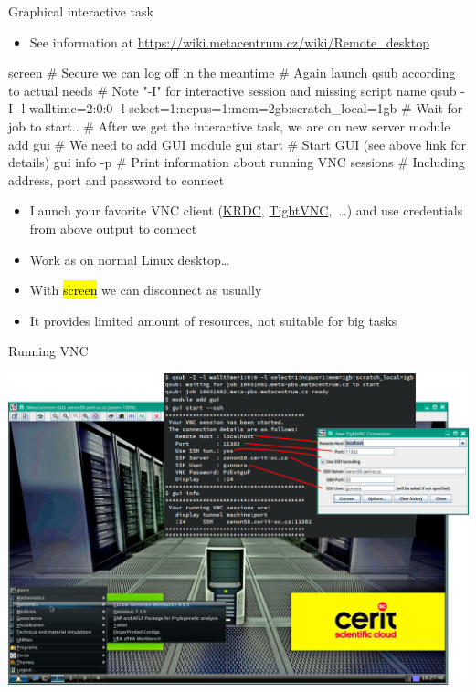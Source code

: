 \documentclass[compress, ucs, xelatex, 11pt, xcolor=svgnames, aspectratio=169,
	hyperref={
		bookmarks=true,
		unicode=true,
		colorlinks=true,
		pdftitle={Linux, command line and MetaCentrum},
		plainpages=false,
		pdfauthor={Vojtech Zeisek},
		pdfsubject={Course about use of Linux command line, writing shell scripts and using MetaCentrum of CESNET},
		pdfcreator={XeLaTeX},
		pdfkeywords={Linux, GNU, BASH, shell, command line, MetaCentrum},
		linkcolor=DarkRed, %
		anchorcolor=DarkBlue, %
		citecolor=Indigo, %
		filecolor=NavyBlue, %
		menucolor=DarkMagenta, %
		urlcolor=DarkBlue, %
		pdftex},
	url={hyphens, lowtilde} %
	]{beamer}
\renewcommand{\texttt}[1]{\hl{\ttfamily #1}}
\begin{document}
\begin{frame}[fragile]{Graphical interactive task}
	\begin{itemize}
		\item See information at \url{https://wiki.metacentrum.cz/wiki/Remote_desktop}
	\end{itemize}
	\begin{bashcode}
    screen # Secure we can log off in the meantime
    # Again launch qsub according to actual needs
    # Note "-I" for interactive session and missing script name
    qsub -I -l walltime=2:0:0 -l select=1:ncpus=1:mem=2gb:scratch_local=1gb
    # Wait for job to start..
    # After we get the interactive task, we are on new server
    module add gui # We need to add GUI module
    gui start # Start GUI (see above link for details)
    gui info -p # Print information about running VNC sessions
                # Including address, port and password to connect
	\end{bashcode}
	\begin{itemize}
		\item Launch your favorite VNC client (\href{https://kde.org/applications/internet/krdc/}{KRDC}, \href{https://www.tightvnc.com/}{TightVNC},~\ldots) and use credentials from above output to connect
		\item Work as on normal Linux desktop\ldots
		\item With \texttt{screen} we can disconnect as usually
		\item It provides limited amount of resources, not suitable for big tasks
	\end{itemize}
\end{frame}

\begin{frame}{Running VNC}
	\begin{center}
		\includegraphics[width=\textwidth-1cm]{vnc.png}
	\end{center}
\end{frame}
\end{document}

